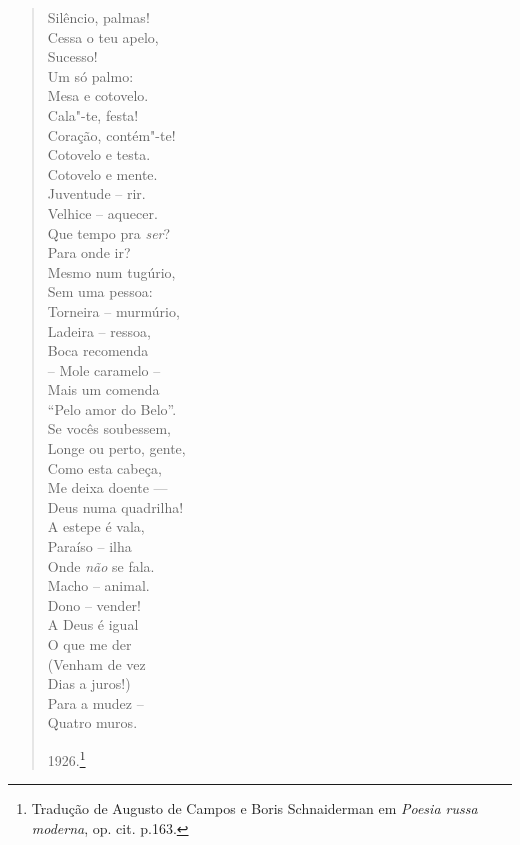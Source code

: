 \begin{verse}
Silêncio, palmas! \\
Cessa o teu apelo, \\
Sucesso! \\
Um só palmo: \\
Mesa e cotovelo. \\[8pt]
Cala"-te, festa! \\
Coração, contém"-te! \\
Cotovelo e testa. \\
Cotovelo e mente. \\[8pt]
Juventude -- rir. \\
Velhice -- aquecer. \\
Que tempo pra \emph{ser}? \\
Para onde ir? \\[8pt]
Mesmo num tugúrio, \\
Sem uma pessoa: \\
Torneira -- murmúrio, \\
Ladeira -- ressoa, \\[8pt]
Boca recomenda \\
-- Mole caramelo -- \\
Mais um comenda \\
``Pelo amor do Belo''. \\[8pt]
Se vocês soubessem, \\
Longe ou perto, gente, \\
Como esta cabeça, \\
Me deixa doente --- \\[8pt]
Deus numa quadrilha! \\
A estepe é vala, \\
Paraíso -- ilha \\
Onde \emph{não} se fala. \\[8pt]
Macho -- animal. \\
Dono -- vender! \\
A Deus é igual \\
O que me der \\[8pt]
(Venham de vez \\
Dias a juros!) \\
Para a mudez -- \\
Quatro muros. \\
\begin{flushright}
1926.\footnote{Tradução de Augusto de Campos e Boris Schnaiderman em
  \emph{Poesia russa moderna}, op. cit. p.163.}
  \end{flushright}
  \end{verse}

